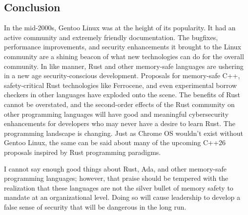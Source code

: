 \subsection*{Conclusion}
In the mid-2000s, Gentoo Linux was at the height of its popularity. It had an active community and extremely friendly documentation. The bugfixes, performance improvements, and security enhancements it brought to the Linux community are a shining beacon of what new technologies can do for the overall community. In like manner, Rust and other memory-safe languages are ushering in a new age security-conscious development. Proposals for memory-safe C++, safety-critical Rust technologies like Ferrocene, and even experimental borrow checkers in other languages have exploded onto the scene. The benefits of Rust cannot be overstated, and the second-order effects of the Rust community on other programming languages will have good and meaningful cybersecurity enhancements for developers who may never have a desire to learn Rust. The programming landscape is changing. Just as Chrome OS wouldn't exist without Gentoo Linux, the same can be said about many of the upcoming C++26 proposals inspired by Rust programming paradigms.

I cannot say enough good things about Rust, Ada, and other memory-safe programming languages; however, that praise should be tempered with the realization that these languages are not the silver bullet of memory safety to mandate at an organizational level. Doing so will cause leadership to develop a false sense of security that will be dangerous in the long run.
